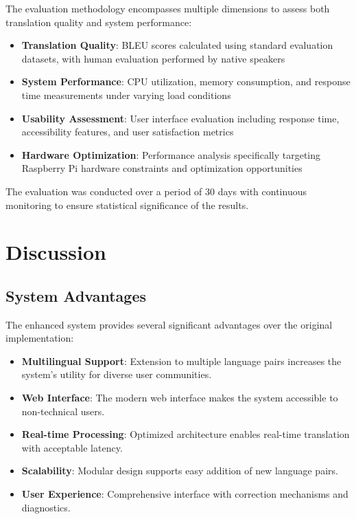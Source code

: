 \documentclass[conference]{IEEEtran}
\begin{document}
The evaluation methodology encompasses multiple dimensions to assess both translation quality and system performance:

\begin{itemize}
    \item \textbf{Translation Quality}: BLEU scores calculated using standard evaluation datasets, with human evaluation performed by native speakers
    \item \textbf{System Performance}: CPU utilization, memory consumption, and response time measurements under varying load conditions
    \item \textbf{Usability Assessment}: User interface evaluation including response time, accessibility features, and user satisfaction metrics
    \item \textbf{Hardware Optimization}: Performance analysis specifically targeting Raspberry Pi hardware constraints and optimization opportunities
\end{itemize}

The evaluation was conducted over a period of 30 days with continuous monitoring to ensure statistical significance of the results.

\section{Discussion}

\subsection{System Advantages}

The enhanced system provides several significant advantages over the original implementation:

\begin{itemize}
    \item \textbf{Multilingual Support}: Extension to multiple language pairs increases the system's utility for diverse user communities.
    \item \textbf{Web Interface}: The modern web interface makes the system accessible to non-technical users.
    \item \textbf{Real-time Processing}: Optimized architecture enables real-time translation with acceptable latency.
    \item \textbf{Scalability}: Modular design supports easy addition of new language pairs.
    \item \textbf{User Experience}: Comprehensive interface with correction mechanisms and diagnostics.
\end{itemize}
\end{document}
